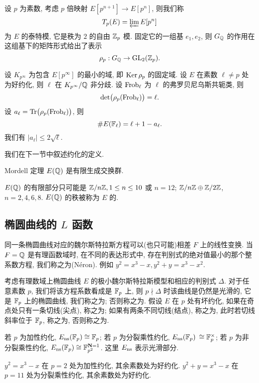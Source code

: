 设 $p$ 为素数, 考虑 $p$ 倍映射 $E[p^{n+1}]\to E[p^n]$, 则我们称
  \[T_p(E)=\varprojlim\limits E[p^n]\]
为 $E$ 的泰特模, 它是秩为 $2$ 的自由 ${\mathbb{Z}}_p$ 模. 固定它的一组基 $e_1,e_2$, 则 $G_{\mathbb{Q}}$ 的作用在这组基下的矩阵形式给出了表示
  \[\rho_p:G_{\mathbb{Q}}\to{\mathrm{GL}}_2({\mathbb{Z}}_p).\]
\begin{theorem}{}{}
设 $K_{p^\infty}$ 为包含 $E[p^\infty]$ 的最小的域, 即 ${\mathrm{Ker}\,} \rho_p$ 的固定域. 设 $E$ 在素数 $\ell\neq p$ 处为好约化, 则 $\ell$ 在 $K_{p^\infty}/{\mathbb{Q}}$ 非分歧. 设 ${\mathrm{Frob}}_\ell$ 为 $\ell$ 的弗罗贝尼乌斯共轭类, 则
  \[\det\bigl(\rho_p({\mathrm{Frob}}_\ell)\bigr)=\ell.\]
设 $a_\ell={\mathrm{Tr}}\bigl(\rho_p({\mathrm{Frob}}_\ell)\bigr)$, 则
  \[\# E({\mathbb{F}}_\ell)=\ell+1-a_\ell.\]
我们有 $|a_\ell|\le 2\sqrt{\ell}$.
\end{theorem}
我们在下一节中叙述约化的定义.

\begin{theorem}{Mordell 定理}{}
$E({\mathbb{Q}})$ 是有限生成交换群.
\end{theorem}

$E({\mathbb{Q}})$ 的有限部分只可能是 ${\mathbb{Z}}/n{\mathbb{Z}},1\le n\le 10$ 或 $n=12$; ${\mathbb{Z}}/n{\mathbb{Z}}\oplus{\mathbb{Z}}/2{\mathbb{Z}}$, $n=2,4,6,8$. $E({\mathbb{Q}})$ 的秩被称为 $E$ 的. 

\subsection{椭圆曲线的 \texorpdfstring{$L$}{L} 函数}
同一条椭圆曲线对应的魏尔斯特拉斯方程可以(也只可能)相差 $F$ 上的线性变换. 当 $F={\mathbb{Q}}$ 是有理函数域时, 在不同的表达形式中, 存在判别式的绝对值最小的那个整系数方程, 我们称之为(N\'eron). 例如 $y^2=x^3-x, y^2+y=x^3-x^2$.

考虑有理数域上椭圆曲线 $E$ 的极小魏尔斯特拉斯模型和相应的判别式 $\Delta$. 对于任意素数 $p$, 我们将该方程系数看成是 ${\mathbb{F}}_p$ 上, 则 $p\nmid\Delta$ 时该曲线是仍然是光滑的, 它是 ${\mathbb{F}}_p$ 上的椭圆曲线, 我们称之为; 否则称之为. 假设 $E$ 在 $p$ 处有坏约化, 如果在奇点处只有一条切线(尖点), 称之为; 如果有两条不同切线(结点), 称之为, 此时若切线斜率位于 ${\mathbb{F}}_p$, 称之为, 否则称之为.
\begin{proposition}{}{}
若 $p$ 为加性约化, $E_{\mathrm{ns}}({\mathbb{F}}_p)\cong {\mathbb{F}}_p$;
若 $p$ 为分裂乘性约化, $E_{\mathrm{ns}}({\mathbb{F}}_p)$ $\cong {\mathbb{F}}_p^\times$;
若 $p$ 为非分裂乘性约化, $E_{\mathrm{ns}}({\mathbb{F}}_p)\cong {\mathbb{F}}_{p^2}^{{\mathbf{N}}=1}$. 这里 $E_{\mathrm{ns}}$ 表示光滑部分.
\end{proposition}

\begin{example}
$y^2=x^3-x$ 在 $p=2$ 处为加性约化, 其余素数处为好约化. $y^2+y=x^3-x$ 在 $p=11$ 处为分裂乘性约化, 其余素数处为好约化.
\end{example}


